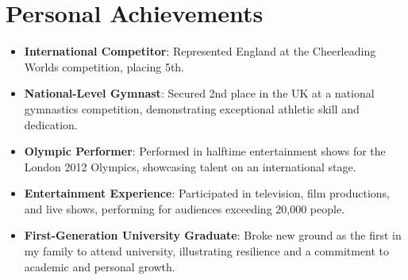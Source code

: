 \documentclass[11 pt,oneside,a4paper,titlepage]{article}
\begin{document}
{\begin{minipage}{11.3cm}
        \section*{{\faTrophy} Personal Achievements}
        \vspace*{-0.5cm}
        \begin{multicols}{2}
            \raggedcolumns
            \begin{itemize}
                \footnotesize
                \item \textbf{International Competitor}: Represented England at the Cheerleading Worlds competition, placing 5th.
                \item \textbf{National-Level Gymnast}: Secured 2nd place in the UK at a national gymnastics competition, demonstrating exceptional athletic skill and dedication.
                \item \textbf{Olympic Performer}: Performed in halftime entertainment shows for the London 2012 Olympics, showcasing talent on an international stage.
                \item \textbf{Entertainment Experience}: Participated in television, film productions, and live shows, performing for audiences exceeding 20,000 people.
                \item \textbf{First-Generation University Graduate}: Broke new ground as the first in my family to attend university, illustrating resilience and a commitment to academic and personal growth.
            \end{itemize}
        \end{multicols}


    \end{minipage}}
\end{document}
